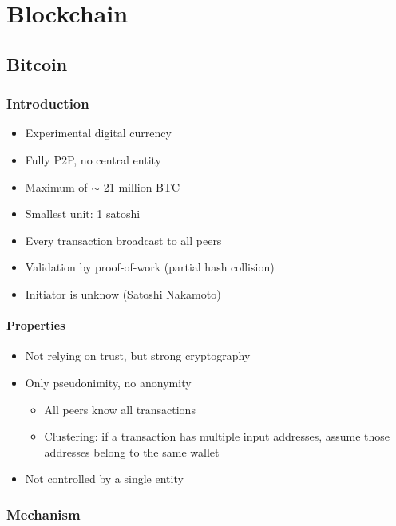 

\section{Blockchain}



\subsection{Bitcoin}

\subsubsection{Introduction}
\begin{itemize}
    \item Experimental digital currency
    \item Fully P2P, no central entity
    \item Maximum of $\sim$ 21 million BTC
    \item Smallest unit: 1 satoshi
    \item Every transaction broadcast to all peers
    \item Validation by proof-of-work (partial hash collision)
    \item Initiator is unknow (Satoshi Nakamoto)
\end{itemize}

\paragraph{Properties}
\begin{itemize}
    \item Not relying on trust, but strong cryptography
    \item Only pseudonimity, no anonymity
    \begin{itemize}
        \item All peers know all transactions
        \item Clustering: if a transaction has multiple input addresses, assume those addresses belong to the same wallet
    \end{itemize}
    \item Not controlled by a single entity
\end{itemize}

\subsubsection{Mechanism}
